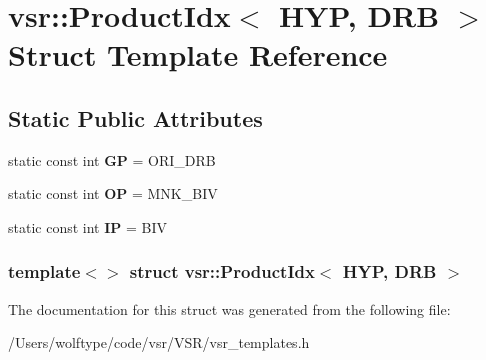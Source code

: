 \hypertarget{structvsr_1_1_product_idx_3_01_h_y_p_00_01_d_r_b_01_4}{\section{vsr\-:\-:Product\-Idx$<$ H\-Y\-P, D\-R\-B $>$ Struct Template Reference}
\label{structvsr_1_1_product_idx_3_01_h_y_p_00_01_d_r_b_01_4}
}
\subsection*{Static Public Attributes}
\begin{DoxyCompactItemize}
\item 
\hypertarget{structvsr_1_1_product_idx_3_01_h_y_p_00_01_d_r_b_01_4_a40552678803d5865b7cbb19c785e5d4b}{static const int {\bfseries G\-P} = O\-R\-I\-\_\-\-D\-R\-B}\label{structvsr_1_1_product_idx_3_01_h_y_p_00_01_d_r_b_01_4_a40552678803d5865b7cbb19c785e5d4b}

\item 
\hypertarget{structvsr_1_1_product_idx_3_01_h_y_p_00_01_d_r_b_01_4_a2400295e6d7a3694ae23d0250e27c5a2}{static const int {\bfseries O\-P} = M\-N\-K\-\_\-\-B\-I\-V}\label{structvsr_1_1_product_idx_3_01_h_y_p_00_01_d_r_b_01_4_a2400295e6d7a3694ae23d0250e27c5a2}

\item 
\hypertarget{structvsr_1_1_product_idx_3_01_h_y_p_00_01_d_r_b_01_4_a314c25c10c54064d5ddfa8655420bde0}{static const int {\bfseries I\-P} = B\-I\-V}\label{structvsr_1_1_product_idx_3_01_h_y_p_00_01_d_r_b_01_4_a314c25c10c54064d5ddfa8655420bde0}

\end{DoxyCompactItemize}
\subsubsection*{template$<$$>$ struct vsr\-::\-Product\-Idx$<$ H\-Y\-P, D\-R\-B $>$}



The documentation for this struct was generated from the following file\-:\begin{DoxyCompactItemize}
\item 
/\-Users/wolftype/code/vsr/\-V\-S\-R/vsr\-\_\-templates.\-h\end{DoxyCompactItemize}
